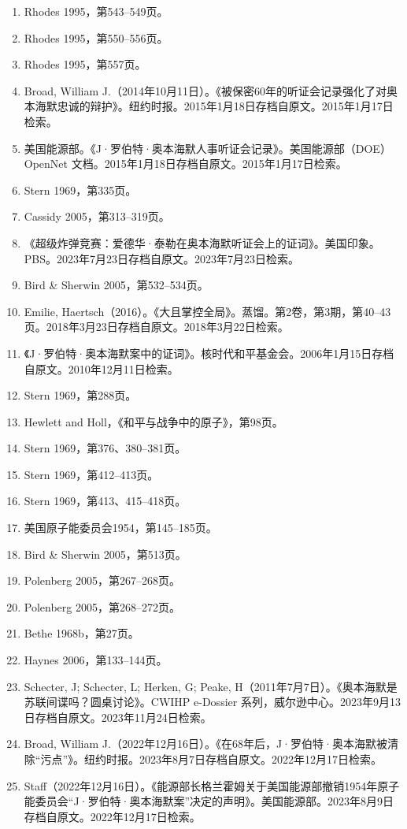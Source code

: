 \begin{enumerate}
\item Rhodes 1995，第543–549页。
\item Rhodes 1995，第550–556页。
\item Rhodes 1995，第557页。
\item Broad, William J.（2014年10月11日）。《被保密60年的听证会记录强化了对奥本海默忠诚的辩护》。纽约时报。2015年1月18日存档自原文。2015年1月17日检索。
\item 美国能源部。《J·罗伯特·奥本海默人事听证会记录》。美国能源部（DOE）OpenNet 文档。2015年1月18日存档自原文。2015年1月17日检索。
\item Stern 1969，第335页。
\item Cassidy 2005，第313–319页。
\item 《超级炸弹竞赛：爱德华·泰勒在奥本海默听证会上的证词》。美国印象。PBS。2023年7月23日存档自原文。2023年7月23日检索。
\item Bird & Sherwin 2005，第532–534页。
\item Emilie, Haertsch（2016）。《大且掌控全局》。蒸馏。第2卷，第3期，第40–43页。2018年3月23日存档自原文。2018年3月22日检索。
\item 《J·罗伯特·奥本海默案中的证词》。核时代和平基金会。2006年1月15日存档自原文。2010年12月11日检索。
\item Stern 1969，第288页。
\item Hewlett and Holl，《和平与战争中的原子》，第98页。
\item Stern 1969，第376、380–381页。
\item Stern 1969，第412–413页。
\item Stern 1969，第413、415–418页。
\item 美国原子能委员会1954，第145–185页。
\item Bird & Sherwin 2005，第513页。
\item Polenberg 2005，第267–268页。
\item Polenberg 2005，第268–272页。
\item Bethe 1968b，第27页。
\item Haynes 2006，第133–144页。
\item Schecter, J; Schecter, L; Herken, G; Peake, H（2011年7月7日）。《奥本海默是苏联间谍吗？圆桌讨论》。CWIHP e-Dossier 系列，威尔逊中心。2023年9月13日存档自原文。2023年11月24日检索。
\item Broad, William J.（2022年12月16日）。《在68年后，J·罗伯特·奥本海默被清除“污点”》。纽约时报。2023年8月7日存档自原文。2022年12月17日检索。
\item Staff（2022年12月16日）。《能源部长格兰霍姆关于美国能源部撤销1954年原子能委员会“J·罗伯特·奥本海默案”决定的声明》。美国能源部。2023年8月9日存档自原文。2022年12月17日检索。

\end{enumerate}
